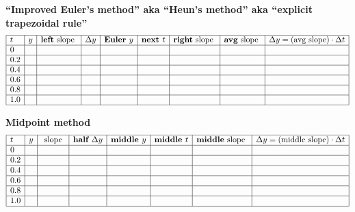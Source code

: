 \documentclass[12pt]{article}
\renewcommand{\subsection}[1]{\textbf{#1} \\}
\begin{document}
\subsection{``Improved Euler's method'' aka ``Heun's method'' aka ``explicit trapezoidal rule''}
\[
    \begin{array}{|l|l|l|l|l|l|l|l|l|} 
    \hline
    t & 
    y & 
    \textbf{left} \textrm{ slope } &
    \Delta y &
    \textbf{Euler } y &
    \textbf{next } t &
    \textbf{right} \textrm{ slope } &
    \textbf{avg} \textrm{ slope } & 
    \Delta y = (\textrm{avg slope})\cdot\Delta t       \\\hline
    0                   & & & & & & & & \\\hline
    0.2                 & & & & & & & & \\\hline
    0.4                 & & & & & & & & \\\hline
    0.6                 & & & & & & & & \\\hline
    0.8                 & & & & & & & & \\\hline
    1.0                 & & & & & & & & \\\hline
    \end{array}
\]

\subsection{Midpoint method}
\[
    \begin{array}{|l|l|l|l|l|l|l|l|} 
    \hline
    t & 
    y & 
    \textrm{ slope } &
    \textbf{half } \Delta y &
    \textbf{middle } y &
    \textbf{middle } t &
    \textbf{middle} \textrm{ slope } & 
    \Delta y = (\textrm{middle slope})\cdot\Delta t       \\\hline
    0                   & & & & & & & \\\hline
    0.2                 & & & & & & & \\\hline
    0.4                 & & & & & & & \\\hline
    0.6                 & & & & & & & \\\hline
    0.8                 & & & & & & & \\\hline
    1.0                 & & & & & & & \\\hline
    \end{array}
\]
\end{document}
